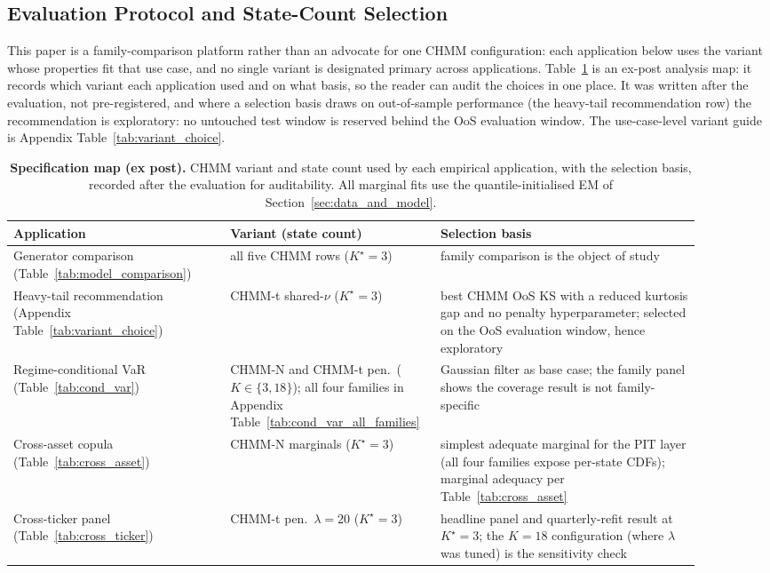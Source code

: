 \subsection{Evaluation Protocol and State-Count Selection}

This paper is a family-comparison platform rather than an advocate for one CHMM configuration: each application below uses the variant whose properties fit that use case, and no single variant is designated primary across applications. Table~\ref{tab:spec_map} is an ex-post analysis map: it records which variant each application used and on what basis, so the reader can audit the choices in one place. It was written after the evaluation, not pre-registered, and where a selection basis draws on out-of-sample performance (the heavy-tail recommendation row) the recommendation is exploratory: no untouched test window is reserved behind the OoS evaluation window. The use-case-level variant guide is Appendix Table~\ref{tab:variant_choice}.

\begin{table}[!ht]
\centering
\small
\caption{\textbf{Specification map (ex post).} CHMM variant and state count used by each empirical application, with the selection basis, recorded after the evaluation for auditability. All marginal fits use the quantile-initialised EM of Section~\ref{sec:data_and_model}.}
\label{tab:spec_map}
\begin{tabular}{p{0.30\linewidth} p{0.24\linewidth} p{0.36\linewidth}}
\toprule
Application & Variant (state count) & Selection basis \\
\midrule
Generator comparison (Table~\ref{tab:model_comparison}) & all five CHMM rows ($K^\star = 3$) & family comparison is the object of study \\
Heavy-tail recommendation (Appendix Table~\ref{tab:variant_choice}) & CHMM-t shared-$\nu$ ($K^\star = 3$) & best CHMM OoS KS with a reduced kurtosis gap and no penalty hyperparameter; selected on the OoS evaluation window, hence exploratory \\
Regime-conditional VaR (Table~\ref{tab:cond_var}) & CHMM-N and CHMM-t pen.\ ($K \in \{3, 18\}$); all four families in Appendix Table~\ref{tab:cond_var_all_families} & Gaussian filter as base case; the family panel shows the coverage result is not family-specific \\
Cross-asset copula (Table~\ref{tab:cross_asset}) & CHMM-N marginals ($K^\star = 3$) & simplest adequate marginal for the PIT layer (all four families expose per-state CDFs); marginal adequacy per Table~\ref{tab:cross_asset} \\
Cross-ticker panel (Table~\ref{tab:cross_ticker}) & CHMM-t pen.\ $\lambda = 20$ ($K^\star = 3$) & headline panel and quarterly-refit result at $K^\star = 3$; the $K = 18$ configuration (where $\lambda$ was tuned) is the sensitivity check \\
\bottomrule
\end{tabular}
\end{table}


